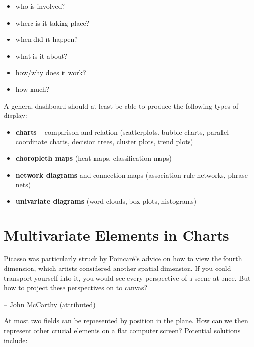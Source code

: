 \begin{itemize}[noitemsep]
\item who is involved?
\item where is it taking place? 
\item when did it happen? 
\item what is it about? 
\item how/why does it work? 
\item how much? 
\end{itemize}
A general dashboard should at least be able to produce the following types of display: 
\begin{itemize}[noitemsep,topsep=0pt]
\item \textbf{charts} -- comparison and relation (scatterplots, bubble charts, parallel coordinate charts, decision trees, cluster plots, trend plots) 
\item \textbf{choropleth maps} (heat maps, classification maps)  
\item \textbf{network diagrams} and connection maps (association rule networks, phrase nets)
\item \textbf{univariate diagrams} (word clouds, box plots, histograms) 
\end{itemize}  
\section{Multivariate Elements in Charts}
\label{appendix:datapresentation}
\begin{tcolorbox}[title=Cubism's Missing Link]
Picasso was particularly struck by Poincar\'e's advice on how to view the fourth dimension, which artists considered another spatial dimension. If you could transport yourself into it, you would see every perspective of a scene at once. But how to project these perspectives on to canvas?\\[-0.6cm]
\begin{flushright}
-- John McCarthy (attributed)
\end{flushright}
\end{tcolorbox}\noindent
At most two fields can be represented by position in the plane. How can we then represent other crucial elements on a flat computer screen? \newl Potential solutions include:   


